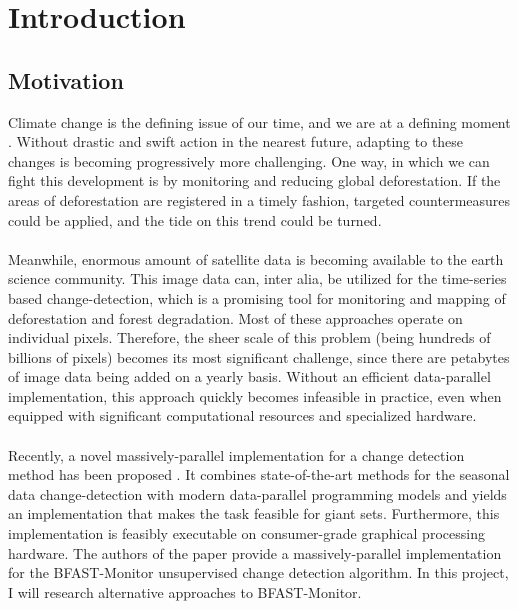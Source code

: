 \documentclass[main.tex]{subfiles}
\begin{document}
\chapter{Introduction}
\label{chap:intro}
\section{Motivation}
\label{sec:motivation}
Climate change is the defining issue of our time, and we are at a defining
moment \cite{un}. Without drastic and swift action in the nearest future, adapting to
these changes is becoming progressively more challenging. One way, in which we
can fight this development is by monitoring and reducing global deforestation.
If the areas of deforestation are registered in a timely fashion, targeted
countermeasures could be applied, and the tide on this trend could be turned. \\\\
Meanwhile, enormous amount of satellite data is becoming available to the earth
science community. This image data can, inter alia, be utilized for the
time-series based change-detection, which is a promising tool for monitoring and
mapping of deforestation and forest degradation. Most of these approaches
operate on individual pixels. Therefore, the sheer scale of this problem (being
hundreds of billions of pixels) becomes its most significant challenge, since
there are petabytes of image data being added on a yearly basis. Without an
efficient data-parallel implementation, this approach quickly becomes infeasible in
practice, even when equipped with significant computational resources and
specialized hardware. \\\\
Recently, a novel massively-parallel implementation for a
change detection method has been proposed \cite{bfast_monitor}. It combines state-of-the-art methods
for the seasonal data change-detection with modern data-parallel programming
models and yields an implementation that makes the task feasible for giant sets.
Furthermore, this implementation is feasibly executable on consumer-grade
graphical processing hardware. The authors of the paper provide a
massively-parallel implementation for the BFAST-Monitor unsupervised change
detection algorithm. 
In this project, I will research alternative approaches to
BFAST-Monitor.
\end{document}
